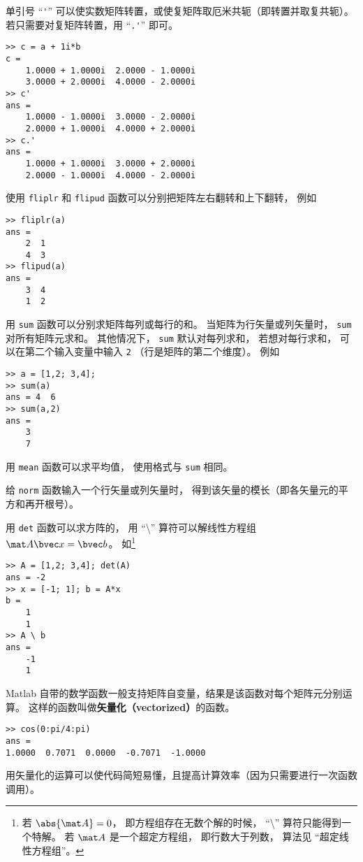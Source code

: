 单引号 “\verb|'|” 可以使实数矩阵转置，或使复矩阵取厄米共轭（即转置并取复共轭）。若只需要对复矩阵转置，用 “\verb|.'|” 即可。
\begin{lstlisting}[language=matlabC]
>> c = a + 1i*b
c =
    1.0000 + 1.0000i  2.0000 - 1.0000i
    3.0000 + 2.0000i  4.0000 - 2.0000i
>> c'
ans =
    1.0000 - 1.0000i  3.0000 - 2.0000i
    2.0000 + 1.0000i  4.0000 + 2.0000i
>> c.'
ans =
    1.0000 + 1.0000i  3.0000 + 2.0000i
    2.0000 - 1.0000i  4.0000 - 2.0000i
\end{lstlisting}
使用 \verb|fliplr| 和 \verb|flipud| 函数可以分别把矩阵左右翻转和上下翻转， 例如
\begin{lstlisting}[language=matlabC]
>> fliplr(a)
ans =
    2  1
    4  3
>> flipud(a)
ans =
    3  4
    1  2
\end{lstlisting}

用 \verb|sum| 函数可以分别求矩阵每列或每行的和。 当矩阵为行矢量或列矢量时， \verb|sum| 对所有矩阵元求和。 其他情况下， \verb|sum| 默认对每列求和， 若想对每行求和， 可以在第二个输入变量中输入 \verb|2| （行是矩阵的第二个维度）。 例如
\begin{lstlisting}[language=matlabC]
>> a = [1,2; 3,4];
>> sum(a)
ans = 4  6
>> sum(a,2)
ans =
    3
    7
\end{lstlisting}
用 \verb|mean| 函数可以求平均值， 使用格式与 \verb|sum| 相同。

给 \verb|norm| 函数输入一个行矢量或列矢量时， 得到该矢量的模长（即各矢量元的平方和再开根号）。 

用 \verb|det| 函数可以求方阵的， 用 “\textbackslash” 算符可以解线性方程组%
 $\mat A \bvec x = \bvec b$。 如\footnote{若 $\abs{\mat A} = 0$， 即方程组存在无数个解的时候， “\textbackslash” 算符只能得到一个特解。 若 $\mat A$ 是一个超定方程组， 即行数大于列数， 算法见 “超定线性方程组”。}
\begin{lstlisting}[language=matlabC]
>> A = [1,2; 3,4]; det(A)
ans = -2
>> x = [-1; 1]; b = A*x
b =
    1
    1
>> A \ b
ans =
    -1
    1
\end{lstlisting}

Matlab 自带的数学函数一般支持矩阵自变量，结果是该函数对每个矩阵元分别运算。 这样的函数叫做\textbf{矢量化（vectorized）}的函数。
\begin{lstlisting}[language=matlabC]
>> cos(0:pi/4:pi)
ans =
1.0000  0.7071  0.0000  -0.7071  -1.0000
\end{lstlisting}
用矢量化的运算可以使代码简短易懂，且提高计算效率（因为只需要进行一次函数调用）。

